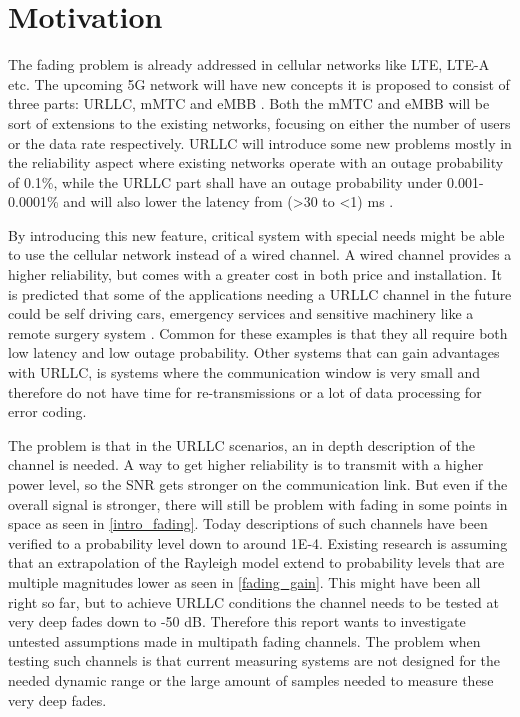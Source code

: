 \section{Motivation}

The fading problem is already addressed in cellular networks like \gls{LTE}, \gls{LTE-A} etc. The upcoming 5G network will have new concepts it is proposed to consist of three parts: \Gls{URLLC}, \gls{mMTC} and \gls{eMBB} \citep{5G}. Both the \gls{mMTC} and \gls{eMBB} will be sort of extensions to the existing networks, focusing on either the number of users or the data rate respectively. \Gls{URLLC} will introduce some new problems mostly in the reliability aspect where existing networks operate with an outage probability of 0.1\%, while the URLLC part shall have an outage probability under 0.001-0.0001\% \citep{LTE,Petar5G} and will also lower the latency from (>30 to <1) ms \citep{LTE,5G_Latency}. 

By introducing this new feature, critical system with special needs might be able to use the cellular network instead of a wired channel. A wired channel provides a higher reliability, but comes with a greater cost in both price and installation. It is predicted that some of the applications needing a URLLC channel in the future could be self driving cars, emergency services and sensitive machinery like a remote surgery system \citep{Petar5G}. Common for these examples is that they all require both low latency and low outage probability. Other systems that can gain advantages with URLLC, is systems where the communication window is very small and therefore do not have time for re-transmissions or a lot of data processing for error coding.


The problem is that in the URLLC scenarios, an in depth description of the channel is needed. A way to get higher reliability is to transmit with a higher power level, so the \gls{SNR} gets stronger on the communication link. But even if the overall signal is stronger, there will still be problem with fading in some points in space as seen in \autoref{intro_fading}. Today descriptions of such channels have been verified to a probability level down to around 1E-4. Existing research is assuming that an extrapolation of the Rayleigh model extend to probability levels that are multiple magnitudes lower as seen in \autoref{fading_gain}. This might have been all right so far, but to achieve URLLC conditions the channel needs to be tested at very deep fades down to -50 dB. Therefore this report wants to investigate untested assumptions made in multipath fading channels. The problem when testing such channels is that current measuring systems are not designed for the needed dynamic range or the large amount of samples needed to measure these very deep fades. 

